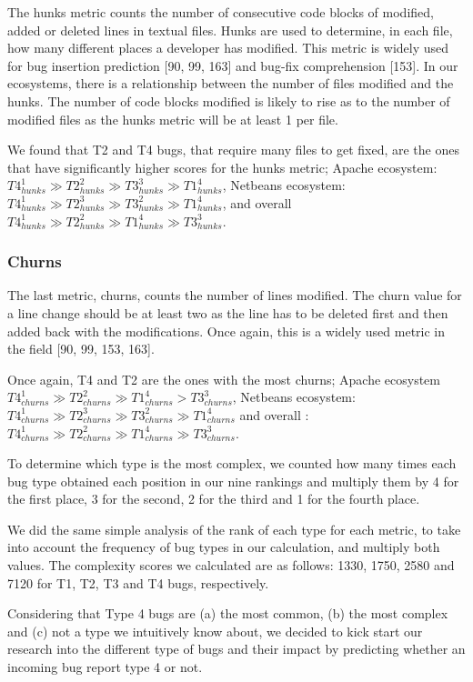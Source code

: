 \documentclass[12pt]{report}
\begin{document}
The hunks metric counts the number of consecutive code blocks of
modified, added or deleted lines in textual files. Hunks are used to
determine, in each file, how many different places a developer has
modified. This metric is widely used for bug insertion prediction {[}90,
99, 163{]} and bug-fix comprehension {[}153{]}. In our ecosystems, there
is a relationship between the number of files modified and the hunks.
The number of code blocks modified is likely to rise as to the number of
modified files as the hunks metric will be at least 1 per file.

We found that T2 and T4 bugs, that require many files to get fixed, are
the ones that have significantly higher scores for the hunks metric;
Apache ecosystem:
\(T4_{hunks}^1 \gg T2_{hunks}^2 \gg T3_{hunks}^3 \gg T1_{hunks}^4\),
Netbeans ecosystem:
\(T4_{hunks}^1 \gg T2_{hunks}^3 \gg T3_{hunks}^2 \gg T1_{hunks}^4\), and
overall
\(T4_{hunks}^1 \gg T2_{hunks}^2 \gg T1_{hunks}^4 \gg T3_{hunks}^3\).

\subsubsection{Churns}\label{churns}

The last metric, churns, counts the number of lines modified. The churn
value for a line change should be at least two as the line has to be
deleted first and then added back with the modifications. Once again,
this is a widely used metric in the field {[}90, 99, 153, 163{]}.

Once again, T4 and T2 are the ones with the most churns; Apache
ecosystem
\(T4_{churns}^1 \gg T2_{churns}^2 \gg T1_{churns}^4 > T3_{churns}^3\),
Netbeans ecosystem:
\(T4_{churns}^1 \gg T2_{churns}^3 \gg T3_{churns}^2 \gg T1_{churns}^4\)
and overall :
\(T4_{churns}^1 \gg T2_{churns}^2 \gg T1_{churns}^4 \gg T3_{churns}^3\).

To determine which type is the most complex, we counted how many times
each bug type obtained each position in our nine rankings and multiply
them by 4 for the first place, 3 for the second, 2 for the third and 1
for the fourth place.

We did the same simple analysis of the rank of each type for each
metric, to take into account the frequency of bug types in our
calculation, and multiply both values. The complexity scores we
calculated are as follows: 1330, 1750, 2580 and 7120 for T1, T2, T3 and
T4 bugs, respectively.

Considering that Type 4 bugs are (a) the most common, (b) the most
complex and (c) not a type we intuitively know about, we decided to kick
start our research into the different type of bugs and their impact by
predicting whether an incoming bug report type 4 or not.
\end{document}
